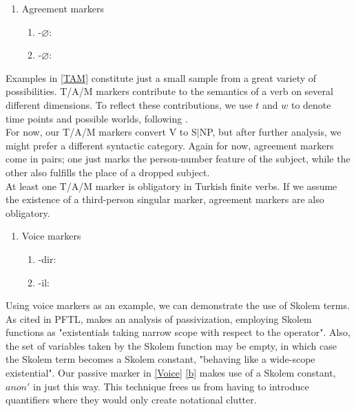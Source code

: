 \documentclass[11pt]{article} %
\begin{document}
\begin{enumerate}[resume*]
	\item Agreement markers \label{Agr}
	\begin{enumerate}[label=(\alph*), ref=(\alph*)]\itemsep1pt
	\item -$\varnothing$:  \label{a}
	\item -$\varnothing$:  \label{b}
	\end{enumerate}
\end{enumerate}

Examples in \ref{TAM} constitute just a small sample from a great variety of possibilities. T/A/M markers contribute to the semantics of a verb on several different dimensions. To reflect these contributions, we use $t$ and $w$ to denote time points and possible worlds, following \citet{MoensSteedman1988}. \\

For now, our T/A/M markers convert V to S$\vert$NP, but after further analysis, we might prefer a different syntactic category. Again for now, agreement markers come in pairs; one just marks the person-number feature of the subject, while the other also fulfills the place of a dropped subject. \\

At least one T/A/M marker is obligatory in Turkish finite verbs. If we assume the existence of a third-person singular marker, agreement markers are also obligatory. 

\begin{enumerate}[resume*]
	\item Voice markers \label{Voice}
	\begin{enumerate}[label=(\alph*), ref=(\alph*)]\itemsep1pt
	\item -dir:  \label{a}
	\item -il:  \label{b}
	\end{enumerate}
\end{enumerate}

Using voice markers as an example, we can demonstrate the use of Skolem terms. As cited in PFTL, \citet{Dowty1981} makes an analysis of passivization, employing Skolem functions as "existentials taking narrow scope with respect to the operator". Also, the set of variables taken by the Skolem function may be empty, in which case the Skolem term becomes a Skolem constant, "behaving like a wide-scope existential". Our passive marker in \ref{Voice} \ref{b} makes use of a Skolem constant, $anon'$ in just this way. This technique frees us from having to introduce quantifiers where they would only create notational clutter. \\
\end{document}
